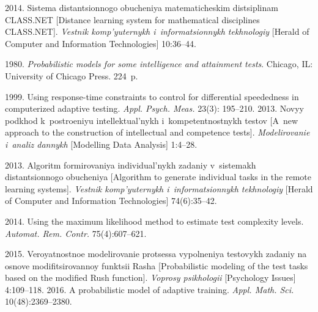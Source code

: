   \begin{multicols}{2}

\renewcommand{\bibname}{\protect\rmfamily References}

{\small\frenchspacing
 {%
 \begin{thebibliography}{99}
     2014. 
Sistema distantsionnogo obucheniya ma\-te\-ma\-ti\-che\-skim distsiplinam CLASS.NET 
[Distance learning system for mathematical disciplines CLASS.NET]. 
\textit{Vestnik komp'yuternykh i~informatsionnykh tekhnologiy} [Herald of 
Computer and Information Technologies] 10:36--44.
    
     1980. \textit{Probabilistic models for some intelligence and attainment 
tests}. Chicago, IL: University of Chicago Press. 224~p.

     1999. Using 
response-time constraints to control for differential speededness in computerized 
adaptive testing. \textit{Appl. Psych. Meas.} 23(3): 195--210.
     2013. 
Novyy podkhod k~postroeniyu intellektual'nykh i~kompetentnostnykh testov [A~new 
approach to the construction of intellectual and competence tests]. 
\textit{Modelirovanie i~analiz dannykh} [Modelling Data Analysis] 1:4--28.

     2013. Algoritm formirovaniya 
individual'nykh zadaniy v~sistemakh distantsionnogo obucheniya [Algorithm to 
generate individual tasks in the remote learning systems]. \textit{Vestnik komp'yuternykh 
i~informatsionnykh tekhnologiy} [Herald of Computer and Information 
Technologies] 74(6):35--42.

     2014. Using the maximum likelihood 
method to estimate test complexity levels. \textit{Automat. Rem. Contr.} 75(4):607--621.

     2015. Veroyatnostnoe mo\-de\-li\-ro\-va\-nie protsessa vypolneniya testovykh 
zadaniy na osno\-ve modifitsirovannoy funktsii Rasha [Probabilistic modeling of the 
test tasks based on the modified Rush function]. \textit{Voprosy psikhologii} 
[Psychology Issues] 4:109--118.
     2016. A probabilistic model of adaptive training. \textit{Appl. 
Math. Sci.} 10(48):2369--2380.
   

\end{thebibliography}}}
\end{multicols}
